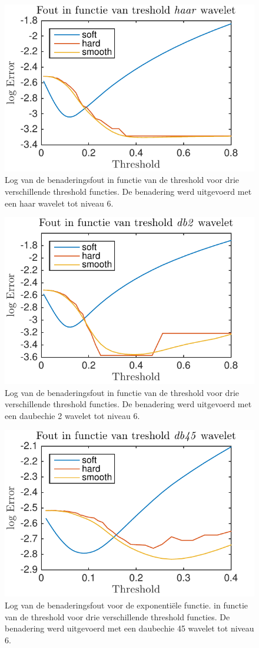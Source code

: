 \begin{figure}
\centering
\includegraphics[width=0.7\linewidth]{../src/denoising/error_1d/error_exp_haar_10}
\caption{Log van de benaderingsfout in functie van de threshold voor drie verschillende threshold functies. De benadering werd uitgevoerd met een haar wavelet tot niveau 6.}
\label{fig:error_exp_haar_10}
\end{figure}
\begin{figure}
\centering
\includegraphics[width=0.7\linewidth]{../src/denoising/error_1d/error_exp_db2_10}
\caption{Log van de benaderingsfout in functie van de threshold voor drie verschillende threshold functies. De benadering werd uitgevoerd met een daubechie 2 wavelet tot niveau 6.}
\label{fig:error_exp_db2_10}
\end{figure}
\begin{figure}
\centering
\includegraphics[width=0.7\linewidth]{../src/denoising/error_1d/error_exp_db45_10}
\caption{Log van de benaderingsfout voor de exponenti\"ele functie. in functie van de threshold voor drie verschillende threshold functies.  De benadering werd uitgevoerd met een daubechie 45 wavelet tot niveau 6.
}
\label{fig:error_exp_db45_10}
\end{figure}


